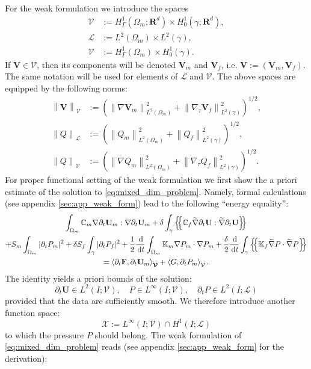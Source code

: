 \documentclass[a4paper]{article}
\numberwithin{equation}{section}
\def\agrad{\widetilde\nabla}
\def\avg#1{\left\{\mskip-5mu\left\{#1\right\}\mskip-5mu\right\}}
\def\CC{\tn C}
\def\d {\,{\rm d}}
\def\ddt#1{\frac{\d #1}{\d t}}
\def\dt{\prtl_t}
\def\dual#1#2{\left\langle #1,#2\right\rangle}
\def\FF{\vc F}
\def\Hf{\mathscr{L}} %
\def\norm#1{\left\|#1\right\|}
\def\prtl{\partial}
\def\Real{{\mathbf R}} %
\def\tn#1{{\mathbb{#1}}}    %
\def\U{\vc U}
\def\V{\vc V}
\def\Vel{{\boldsymbol{\mathcal V}}} %
\def\Vf{{\mathcal V}} %
\def\vc#1{\mathbf{#1}}     %
\newcommand{\eqs}[1]{\begin{equation*}#1\end{equation*}}
\newcommand{\ml}[1]{\begin{multline}#1\end{multline}}
\begin{document}
For the weak formulation we introduce the spaces
\begin{align*}
\Vel &:= H^1_\Gamma(\Omega_m;\Real^d)\times H^1_0(\gamma;\Real^d),\\
\Hf &:= L^2(\Omega_m)\times L^2(\gamma),\\
\Vf &:= H^1_\Gamma(\Omega_m)\times H^1_0(\gamma).
\end{align*}
If $\V\in\Vel$, then its components will be denoted $\V_m$ and $\V_f$, i.e. $\V:=(\V_m,\V_f)$.
The same notation will be used for elements of $\Hf$ and $\Vf$.
The above spaces are equipped by the following norms:
\begin{align*}
\norm{\V}_\Vel &:= (\norm{\nabla\V_m}_{L^2(\Omega_m)}^2 + \norm{\nabla_\tau\V_f}_{L^2(\gamma)}^2)^{1/2},\\
\norm{Q}_\Hf &:= (\norm{Q_m}_{L^2(\Omega_m)}^2 + \norm{Q_f}_{L^2(\gamma)}^2)^{1/2},\\
\norm{Q}_\Vf &:= (\norm{\nabla Q_m}_{L^2(\Omega_m)}^2 + \norm{\nabla_\tau Q_f}_{L^2(\gamma)}^2)^{1/2}.
\end{align*}
For proper functional setting of the weak formulation we first show the a priori estimate of the solution to \eqref{eq:mixed_dim_problem}.
Namely, formal calculations (see appendix \ref{sec:app_weak_form}) lead to the following ``energy equality'':
\ml{ \label{eq:apriori_biot} \int_{\Omega_m}\CC_m\nabla\dt\U_m:\nabla\dt\U_m + \delta\int_\gamma\avg{\CC_f\agrad\dt\U:\agrad\dt\U}\\
+ S_m\int_{\Omega_m}|\dt P_m|^2 + \delta S_f\int_\gamma|\dt P_f|^2
+ \frac12\ddt{}\int_{\Omega_m}\tn K_m\nabla P_m\cdot\nabla P_m
+ \frac\delta2\ddt{}\int_\gamma\avg{\tn K_f\agrad P\cdot\agrad P}\\
= \dual{\dt\FF}{\dt{\U_m}}_{\Vel} + \dual{G}{\dt P_m}_{\Vf}. }
The identity yields a priori bounds of the solution:
\eqs{ \dt\U\in L^2(I;\Vel),\quad P\in L^\infty(I;\Vf),\quad \dt P\in L^2(I;\Hf) }
provided that the data are sufficiently smooth.
% 
We therefore introduce another function space:
\eqs{ \mathcal X := L^\infty( I;\Vf)\cap H^1( I;\Hf) }
to which the pressure $P$ should belong.
The weak formulation of \eqref{eq:mixed_dim_problem} reads (see appendix \ref{sec:app_weak_form} for the derivation):
\end{document}

